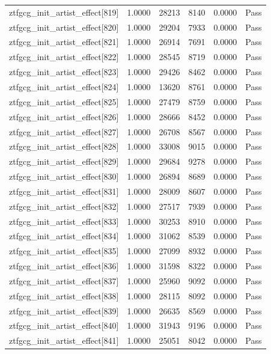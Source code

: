 \begin{table}[htbp]
\begin{tabular}{llrrll}
ztfgcg\_init\_artist\_effect[819] & 1.0000 & 28213 & 8140 & 0.0000 & Pass \\
ztfgcg\_init\_artist\_effect[820] & 1.0000 & 29204 & 7933 & 0.0000 & Pass \\
ztfgcg\_init\_artist\_effect[821] & 1.0000 & 26914 & 7691 & 0.0000 & Pass \\
ztfgcg\_init\_artist\_effect[822] & 1.0000 & 28545 & 8719 & 0.0000 & Pass \\
ztfgcg\_init\_artist\_effect[823] & 1.0000 & 29426 & 8462 & 0.0000 & Pass \\
ztfgcg\_init\_artist\_effect[824] & 1.0000 & 13620 & 8761 & 0.0000 & Pass \\
ztfgcg\_init\_artist\_effect[825] & 1.0000 & 27479 & 8759 & 0.0000 & Pass \\
ztfgcg\_init\_artist\_effect[826] & 1.0000 & 28666 & 8452 & 0.0000 & Pass \\
ztfgcg\_init\_artist\_effect[827] & 1.0000 & 26708 & 8567 & 0.0000 & Pass \\
ztfgcg\_init\_artist\_effect[828] & 1.0000 & 33008 & 9015 & 0.0000 & Pass \\
ztfgcg\_init\_artist\_effect[829] & 1.0000 & 29684 & 9278 & 0.0000 & Pass \\
ztfgcg\_init\_artist\_effect[830] & 1.0000 & 26894 & 8689 & 0.0000 & Pass \\
ztfgcg\_init\_artist\_effect[831] & 1.0000 & 28009 & 8607 & 0.0000 & Pass \\
ztfgcg\_init\_artist\_effect[832] & 1.0000 & 27517 & 7939 & 0.0000 & Pass \\
ztfgcg\_init\_artist\_effect[833] & 1.0000 & 30253 & 8910 & 0.0000 & Pass \\
ztfgcg\_init\_artist\_effect[834] & 1.0000 & 31062 & 8539 & 0.0000 & Pass \\
ztfgcg\_init\_artist\_effect[835] & 1.0000 & 27099 & 8932 & 0.0000 & Pass \\
ztfgcg\_init\_artist\_effect[836] & 1.0000 & 31598 & 8322 & 0.0000 & Pass \\
ztfgcg\_init\_artist\_effect[837] & 1.0000 & 25960 & 9092 & 0.0000 & Pass \\
ztfgcg\_init\_artist\_effect[838] & 1.0000 & 28115 & 8092 & 0.0000 & Pass \\
ztfgcg\_init\_artist\_effect[839] & 1.0000 & 26635 & 8569 & 0.0000 & Pass \\
ztfgcg\_init\_artist\_effect[840] & 1.0000 & 31943 & 9196 & 0.0000 & Pass \\
ztfgcg\_init\_artist\_effect[841] & 1.0000 & 25051 & 8042 & 0.0000 & Pass \\

\end{tabular}
\end{table}
